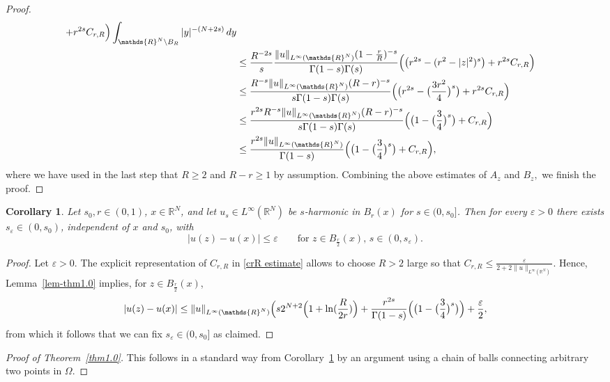 \documentclass[notitlepage,11pt,reqno]{amsart}
\newtheorem{corollary}[theorem]{Corollary}
\theoremstyle{definition}
\numberwithin{equation}{section}
\newcommand{\eps}{{\varepsilon}}
\newcommand{\RR}{\mathds{R}}
\begin{document}
\begin{proof}
\begin{align*}
         + r^{2s} C_{r,R} \Bigr)\int_{\RR^N \setminus B_R} |y|^{-(N+2s)} \, dy\\  
        &\le \frac{ R^{-2s}}{s} \frac{ \|u\|_{L^\infty(\RR^N)}(1-\frac{r}{R})^{-s}}{ \Gamma(1-s)\Gamma(s)} \Bigl( \bigl(r^{2s} - (r^2-|z|^2)^s\bigr)
         + r^{2s} C_{r,R}\Bigr)\\  
        &\le \frac{ R^{-s} \|u\|_{L^\infty(\RR^N)}(R-r)^{-s}}{s \Gamma(1-s)\Gamma(s)} \Bigl( \bigl(r^{2s} -  \bigl(\frac{3r^2}{4}\bigr)^s\bigr)
         + r^{2s} C_{r,R}\Bigr)\\  
    &\le \frac{ r^{2s}R^{-s} \|u\|_{L^\infty(\RR^N)}(R-r)^{-s}}{s \Gamma(1-s)\Gamma(s)} \Bigl( \bigl(1-  \bigl(\frac{3}{4}\bigr)^s\bigr)
         + C_{r,R}\Bigr)\\ 
    &\le \frac{ r^{2s} \|u\|_{L^\infty(\RR^N)}}{\Gamma(1-s)} \Bigl( \bigl(1-  \bigl(\frac{3}{4}\bigr)^s\bigr)
         + C_{r,R}\Bigr), 
\end{align*}
where we have used in the last step that $R \ge 2$ and $R-r\ge 1$ by assumption. Combining the above estimates of $A_z$ and $B_z,$ we finish the proof.
\end{proof}


\begin{corollary}
  \label{cor-thm1.0}
Let $s_0,r \in(0,1)$, $x \in \RR^N$, and let $u_s \in L^\infty(\RR^N)$ be $s$-harmonic in $B_r(x)$ for $s \in (0,s_0]$. Then for every $\varepsilon >0$ there exists $s_\varepsilon \in (0,s_0)$, independent of $x$ and $s_0$, with 
$$
|u(z)-u(x)| \le \varepsilon \qquad \text{for $z  \in B_{\frac{r}{2}}(x)$, $s \in (0,s_\varepsilon)$.}
$$
\end{corollary}

\begin{proof}
Let $\eps>0$. The explicit representation of $C_{r,R}$ in \eqref{crR estimate} allows to choose $R>2$ large so that $C_{r, R}\leq \frac{\varepsilon}{2+2\|u\|_{L^{\infty}(\RR^N)}}$. Hence, Lemma~\ref{lem-thm1.0} implies, for $z  \in B_{\frac{r}{2}}(x)$,
\begin{align*}
|u(z)-u(x)|\leq \|u\|_{L^{\infty}(\RR^N)}\Bigl(s2^{N+2}\Bigl(1+\ln(\frac{R}{2r})\Bigr) +\frac{ r^{2s}}{\Gamma(1-s)}\Bigl( \bigl(1-  \bigl(\frac{3}{4}\bigr)^s\bigr)\Bigr)+  \frac{\varepsilon}{2},
\end{align*} 
from which it follows that we can fix $s_{\eps}\in(0,s_0]$ as claimed.

\end{proof}


\begin{proof}[Proof of Theorem~\ref{thm1.0}]
This follows in a standard way from Corollary~\ref{cor-thm1.0} by an argument using a chain of balls connecting arbitrary two points in $\Omega$. 
\end{proof}
\end{document}
